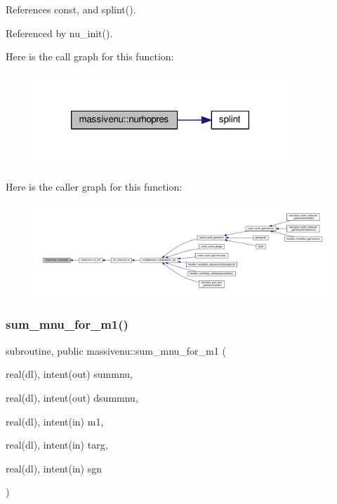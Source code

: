 References const, and splint().



Referenced by nu\+\_\+init().

Here is the call graph for this function\+:
\nopagebreak
\begin{figure}[H]
\begin{center}
\leavevmode
\includegraphics[width=270pt]{namespacemassivenu_ae38eedf1b14513e212f542f0afcb8a7f_cgraph}
\end{center}
\end{figure}
Here is the caller graph for this function\+:
\nopagebreak
\begin{figure}[H]
\begin{center}
\leavevmode
\includegraphics[width=350pt]{namespacemassivenu_ae38eedf1b14513e212f542f0afcb8a7f_icgraph}
\end{center}
\end{figure}
\mbox{\label{namespacemassivenu_a872d62098a8fc9b6d372d05bc210c428}} 
\subsubsection{\texorpdfstring{sum\+\_\+mnu\+\_\+for\+\_\+m1()}{sum\_mnu\_for\_m1()}}
{\footnotesize\ttfamily subroutine, public massivenu\+::sum\+\_\+mnu\+\_\+for\+\_\+m1 (\begin{DoxyParamCaption}\item[{real(dl), intent(out)}]{summnu,  }\item[{real(dl), intent(out)}]{dsummnu,  }\item[{real(dl), intent(in)}]{m1,  }\item[{real(dl), intent(in)}]{targ,  }\item[{real(dl), intent(in)}]{sgn }\end{DoxyParamCaption})}



